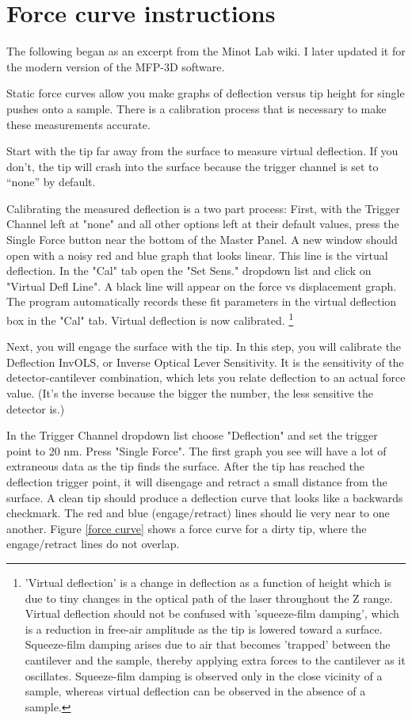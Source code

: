 \documentclass[double,12pt,1in]{beavtex}
\begin{document}
\section{Force curve instructions} \label{force curve appendix}

The following began as an excerpt from the Minot Lab wiki. I later updated it for the modern version of the MFP-3D software.

Static force curves allow you make graphs of deflection versus tip height for single pushes onto a sample. There is a calibration process that is necessary to make these measurements accurate.

Start with the tip far away from the surface to measure virtual deflection. If you don't, the tip will crash into the surface because the trigger channel is set to “none” by default. 

Calibrating the measured deflection is a two part process: First, with the Trigger Channel left at "none" and all other options left at their default values, press the Single Force button near the bottom of the Master Panel. A new window should open with a noisy red and blue graph that looks linear. This line is the virtual deflection. In the "Cal" tab open the "Set Sens." dropdown list and click on "Virtual Defl Line". A black line will appear on the force vs displacement graph. The program automatically records these fit parameters in the virtual deflection box in the "Cal" tab. Virtual deflection is now calibrated. \footnote{'Virtual deflection' is a change in deflection as a function of height which is due to tiny changes in the optical path of the laser throughout the Z range. Virtual deflection should not be confused with 'squeeze-film damping', which is a reduction in free-air amplitude as the tip is lowered toward a surface. Squeeze-film damping arises due to air that becomes 'trapped' between the cantilever and the sample, thereby applying extra forces to the cantilever as it oscillates. Squeeze-film damping is observed only in the close vicinity of a sample, whereas virtual deflection can be observed in the absence of a sample.}
        
Next, you will engage the surface with the tip. In this step, you will calibrate the Deflection InvOLS, or Inverse Optical Lever Sensitivity. It is the sensitivity of the detector-cantilever combination, which lets you relate deflection to an actual force value. (It's the inverse because the bigger the number, the less sensitive the detector is.) 

In the Trigger Channel dropdown list choose "Deflection" and set the trigger point to 20 nm. Press "Single Force". The first graph you see will have a lot of extraneous data as the tip finds the surface. After the tip has reached the deflection trigger point, it will disengage and retract a small distance from the surface. A clean tip should produce a deflection curve that looks like a backwards checkmark. The red and blue (engage/retract) lines should lie very near to one another. Figure \ref{force curve} shows a force curve for a dirty tip, where the engage/retract lines do not overlap.
\end{document}
